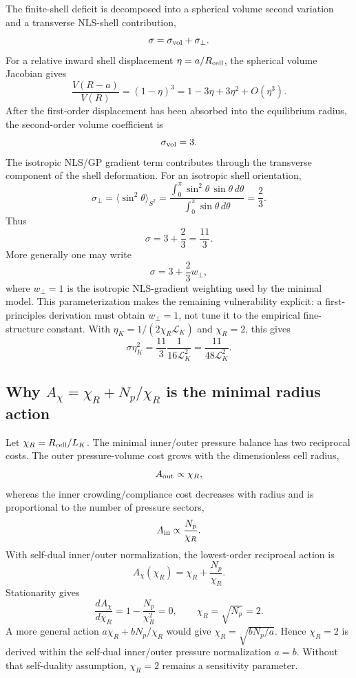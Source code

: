 \documentclass[11pt]{article}
\begin{document}
The finite-shell deficit is decomposed into a spherical volume second variation
and a transverse NLS-shell contribution,
\[
  \sigma=\sigma_{\rm vol}+\sigma_{\perp}.
\]
For a relative inward shell displacement \(\eta=a/R_{\rm cell}\), the spherical
volume Jacobian gives
\[
  \frac{V(R-a)}{V(R)}
  =
  (1-\eta)^3
  =
  1-3\eta+3\eta^2+O(\eta^3).
\]
After the first-order displacement has been absorbed into the equilibrium
radius, the second-order volume coefficient is
\[
  \sigma_{\rm vol}=3.
\]
The isotropic NLS/GP gradient term contributes through the transverse component
of the shell deformation.  For an isotropic shell orientation,
\[
  \sigma_\perp
  =
  \langle\sin^2\theta\rangle_{S^2}
  =
  \frac{\int_0^\pi \sin^2\theta\,\sin\theta\,d\theta}
       {\int_0^\pi \sin\theta\,d\theta}
  =
  \frac{2}{3}.
\]
Thus
\[
  \sigma=3+\frac{2}{3}=\frac{11}{3}.
\]
More generally one may write
\[
  \sigma=3+\frac{2}{3}w_\perp,
\]
where \(w_\perp=1\) is the isotropic NLS-gradient weighting used by the
minimal model.  This parameterization makes the remaining vulnerability
explicit: a first-principles derivation must obtain \(w_\perp=1\), not tune it
to the empirical fine-structure constant.
With \(\eta_K=1/(2\chi_R\mathcal L_K)\) and \(\chi_R=2\), this gives
\[
  \sigma\eta_K^2
  =
  \frac{11}{3}\frac{1}{16\mathcal L_K^2}
  =
  \frac{11}{48\mathcal L_K^2}.
\]

\subsection{Why \(A_\chi=\chi_R+N_p/\chi_R\) is the minimal radius action}
\label{subsec:why-radius-action}

Let \(\chi_R=R_{\rm cell}/L_K\).  The minimal inner/outer pressure balance has
two reciprocal costs.  The outer pressure-volume cost grows with the
dimensionless cell radius,
\[
  A_{\rm out}\propto \chi_R,
\]
whereas the inner crowding/compliance cost decreases with radius and is
proportional to the number of pressure sectors,
\[
  A_{\rm in}\propto \frac{N_p}{\chi_R}.
\]
With self-dual inner/outer normalization, the lowest-order reciprocal action is
\[
  A_\chi(\chi_R)
  =
  \chi_R+\frac{N_p}{\chi_R}.
\]
Stationarity gives
\[
  \frac{dA_\chi}{d\chi_R}
  =
  1-\frac{N_p}{\chi_R^2}=0,
  \qquad
  \chi_R=\sqrt{N_p}=2.
\]
A more general action \(a\chi_R+bN_p/\chi_R\) would give
\(\chi_R=\sqrt{bN_p/a}\).  Hence \(\chi_R=2\) is derived within the
self-dual inner/outer pressure normalization \(a=b\).  Without that
self-duality assumption, \(\chi_R=2\) remains a sensitivity parameter.
\end{document}
